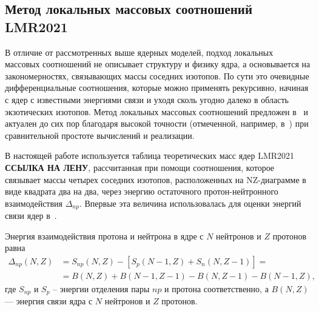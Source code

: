 \subsection{Метод локальных массовых соотношений LMR2021}
В отличие от рассмотренных выше ядерных моделей, подход локальных массовых соотношений не описывает структуру и физику ядра, а основывается на закономерностях, связывающих массы соседних изотопов. По сути это очевидные дифференциальные соотношения, которые можно применять рекурсивно, начиная с ядер с известными энергиями связи и уходя сколь угодно далеко в область экзотических изотопов. Метод локальных массовых соотношений предложен в~\cite{garvey1966} и актуален до сих пор благодаря высокой точности (отмеченной, например, в~\cite{bao2014}) при сравнительной простоте вычислений и реализации. 

В настоящей работе используется таблица теоретических масс ядер LMR2021 \textbf{ССЫЛКА НА ЛЕНУ}, рассчитанная при помощи соотношения, которое связывает массы четырех соседних изотопов, расположенных на NZ-диаграмме в виде квадрата два на два, через энергию остаточного протон-нейтронного взаимодействия $\Delta_{np}$. Впервые эта величина использовалась для оценки энергий связи ядер в~\cite{janecke1974}.

Энергия взаимодействия протона и нейтрона в ядре с $N$ нейтронов и $Z$ протонов равна
\begin{equation}\label{eq:np-interaction}
  \begin{aligned}
    \Delta_{np}(N,Z) &= S_{np}(N,Z) - [S_{p}(N-1,Z) + S_{n}(N,Z-1)] = \\
    &= B(N,Z) + B(N-1,Z-1) - B(N,Z-1) - B(N-1,Z),
  \end{aligned}
\end{equation}
где $S_{np}$ и $S_{p}$ -- энергии отделения пары $np$ и протона соответственно, а $B(N,Z)$ --- энергия связи ядра с $N$ нейтронов и $Z$ протонов.

